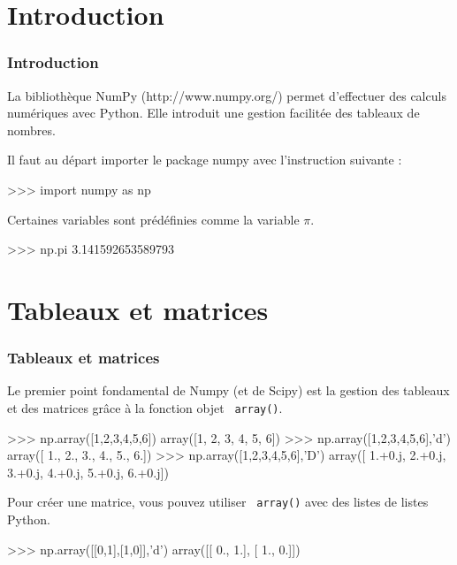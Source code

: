 

\section{Introduction} 

\begin{frame}[fragile]
\frametitle{Introduction}

La bibliothèque NumPy (http://www.numpy.org/) permet d'effectuer des calculs numériques avec Python. Elle introduit une gestion facilitée des tableaux de nombres.

Il faut au départ importer le package numpy avec l'instruction suivante :

\begin{GrayBox}[0.85\textwidth]
\begin{verbatimtab}[3]
>>> import numpy as np
\end{verbatimtab}
\end{GrayBox}

Certaines variables sont prédéfinies comme la variable $\pi$.

\begin{GrayBox}[0.85\textwidth]
\begin{verbatimtab}[3]
>>> np.pi
3.141592653589793
\end{verbatimtab}
\end{GrayBox}

\end{frame}


\section{Tableaux et matrices} 

\begin{frame}[fragile]
\frametitle{Tableaux et matrices}

Le premier point fondamental de Numpy (et de Scipy) est la gestion des tableaux et des matrices grâce à la fonction objet \verb? array()?.

\begin{GrayBox}[0.85\textwidth]
\begin{verbatimtab}[3]
>>> np.array([1,2,3,4,5,6])
array([1, 2, 3, 4, 5, 6])
>>> np.array([1,2,3,4,5,6],'d')
array([ 1.,  2.,  3.,  4.,  5.,  6.])
>>> np.array([1,2,3,4,5,6],'D')
array([ 1.+0.j,  2.+0.j,  3.+0.j,  4.+0.j,  5.+0.j,  6.+0.j])
\end{verbatimtab}
\end{GrayBox}

Pour créer une matrice, vous pouvez utiliser \verb? array()? avec des listes de listes Python.

\begin{GrayBox}[0.85\textwidth]
\begin{verbatimtab}[3]
>>> np.array([[0,1],[1,0]],'d')
array([[ 0.,  1.],
       [ 1.,  0.]])
\end{verbatimtab}
\end{GrayBox}
\end{frame}

